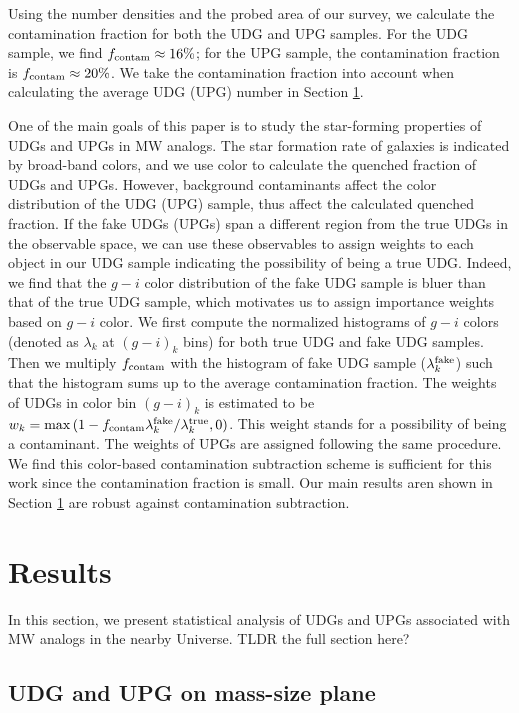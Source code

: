 \documentclass[twocolumn,astrosymb,twocolappendix]{aastex631}
\begin{document}
\begin{CJK*}{UTF8}{gbsn}
Using the number densities and the probed area of our survey, we calculate the contamination fraction for both the UDG and UPG samples. For the UDG sample, we find $f_{\rm contam} \approx 16\%$; for the UPG sample, the contamination fraction is $f_{\rm contam} \approx 20\%$. We take the contamination fraction into account when calculating the average UDG (UPG) number in Section \ref{sec:results}. 

One of the main goals of this paper is to study the star-forming properties of UDGs and UPGs in MW analogs. The star formation rate of galaxies is indicated by broad-band colors, and we use color to calculate the quenched fraction of UDGs and UPGs. However, background contaminants affect the color distribution of the UDG (UPG) sample, thus affect the calculated quenched fraction. If the fake UDGs (UPGs) span a different region from the true UDGs in the observable space, we can use these observables to assign weights to each object in our UDG sample indicating the possibility of being a true UDG. Indeed, we find that the $g-i$ color distribution of the fake UDG sample is bluer than that of the true UDG sample, which motivates us to assign importance weights based on $g-i$ color. We first compute the normalized histograms of $g-i$ colors (denoted as $\lambda_k$ at $(g-i)_{k}$ bins) for both true UDG and fake UDG samples. Then we multiply $f_{\rm contam}$ with the histogram of fake UDG sample ($\lambda_k^{\rm fake}$) such that the histogram sums up to the average contamination fraction. The weights of UDGs in color bin $(g-i)_k$ is estimated to be $w_k = \max\,(1 - f_{\rm contam} \lambda_k^{\rm fake} / \lambda_k^{\rm true}, 0)$. This weight stands for a possibility of being a contaminant. The weights of UPGs are assigned following the same procedure. We find this color-based contamination subtraction scheme is sufficient for this work since the contamination fraction is small. Our main results aren shown in Section \ref{sec:results} are robust against contamination subtraction. 


\section{Results}\label{sec:results}
In this section, we present statistical analysis of UDGs and UPGs associated with MW analogs in the nearby Universe. TLDR the full section here?


\subsection{UDG and UPG on mass-size plane}


\end{CJK*}
\end{document}
